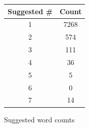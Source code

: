 \documentclass[a4paper,11pt]{article}
\begin{document}
    \begin{figure}[H]
        \centering
        
        \begin{tabular}{c|c}
            \textbf{Suggested \#} & \textbf{Count} \\
            \hline
            \hline
            1 & 7268 \\
            2 & 574 \\
            3 & 111 \\
            4 & 36 \\
            5 & 5 \\
            6 & 0 \\
            7 & 14 \\
        \end{tabular}
        \caption{Suggested word counts}
        \label{fig:duplicates-table}
    \end{figure}
\end{document}
